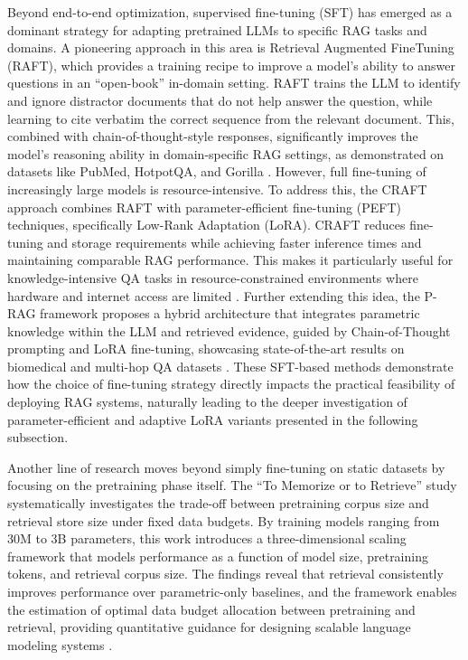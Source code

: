 \documentclass[11pt]{article}
\begin{document}
Beyond end-to-end optimization, supervised fine-tuning (SFT) has emerged as a dominant strategy for adapting pretrained LLMs to specific RAG tasks and domains. A pioneering approach in this area is Retrieval Augmented FineTuning (RAFT), which provides a training recipe to improve a model's ability to answer questions in an ``open-book'' in-domain setting. RAFT trains the LLM to identify and ignore distractor documents that do not help answer the question, while learning to cite verbatim the correct sequence from the relevant document. This, combined with chain-of-thought-style responses, significantly improves the model's reasoning ability in domain-specific RAG settings, as demonstrated on datasets like PubMed, HotpotQA, and Gorilla \cite{ref222}. However, full fine-tuning of increasingly large models is resource-intensive. To address this, the CRAFT approach combines RAFT with parameter-efficient fine-tuning (PEFT) techniques, specifically Low-Rank Adaptation (LoRA). CRAFT reduces fine-tuning and storage requirements while achieving faster inference times and maintaining comparable RAG performance. This makes it particularly useful for knowledge-intensive QA tasks in resource-constrained environments where hardware and internet access are limited \cite{ref223}. Further extending this idea, the P-RAG framework proposes a hybrid architecture that integrates parametric knowledge within the LLM and retrieved evidence, guided by Chain-of-Thought prompting and LoRA fine-tuning, showcasing state-of-the-art results on biomedical and multi-hop QA datasets \cite{ref224}. These SFT-based methods demonstrate how the choice of fine-tuning strategy directly impacts the practical feasibility of deploying RAG systems, naturally leading to the deeper investigation of parameter-efficient and adaptive LoRA variants presented in the following subsection.

Another line of research moves beyond simply fine-tuning on static datasets by focusing on the pretraining phase itself. The ``To Memorize or to Retrieve'' study systematically investigates the trade-off between pretraining corpus size and retrieval store size under fixed data budgets. By training models ranging from 30M to 3B parameters, this work introduces a three-dimensional scaling framework that models performance as a function of model size, pretraining tokens, and retrieval corpus size. The findings reveal that retrieval consistently improves performance over parametric-only baselines, and the framework enables the estimation of optimal data budget allocation between pretraining and retrieval, providing quantitative guidance for designing scalable language modeling systems \cite{ref225}.
\end{document}
